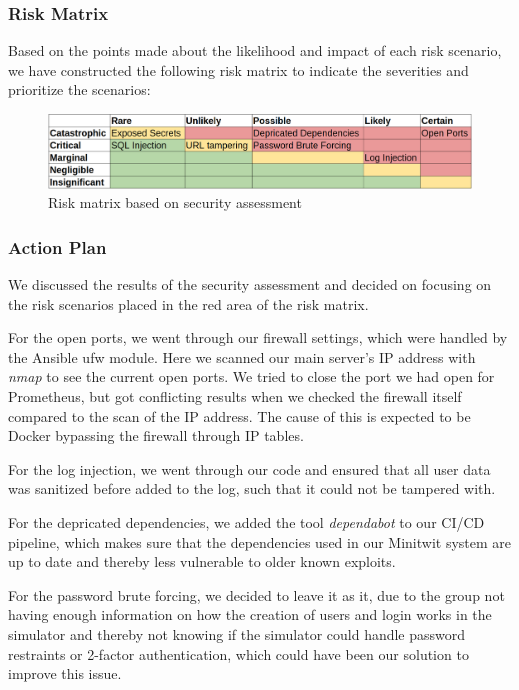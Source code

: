 \subsubsection{Risk Matrix}
Based on the points made about the likelihood and impact of each risk scenario, we have constructed the following risk matrix to indicate the severities and prioritize the scenarios:
\begin{figure}[H]
    \centering
    \includegraphics[width=1\linewidth]{images/risk-matrix.png}
    \caption{Risk matrix based on security assessment}
    \label{fig:enter-label}
\end{figure}
\subsubsection{Action Plan}
We discussed the results of the security assessment and decided on focusing on the risk scenarios placed in the red area of the risk matrix.

For the open ports, we went through our firewall settings, which were handled by the Ansible ufw module. Here we scanned our main server's IP address with \textit{nmap} to see the current open ports. We tried to close the port we had open for Prometheus, but got conflicting results when we checked the firewall itself compared to the scan of the IP address. The cause of this is expected to be Docker bypassing the firewall through IP tables.

For the log injection, we went through our code and ensured that all user data was sanitized before added to the log, such that it could not be tampered with.

For the depricated dependencies, we added the tool \textit{dependabot} to our CI/CD pipeline, which makes sure that the dependencies used in our Minitwit system are up to date and thereby less vulnerable to older known exploits.

For the password brute forcing, we decided to leave it as it, due to the group not having enough information on how the creation of users and login works in the simulator and thereby not knowing if the simulator could handle password restraints or 2-factor authentication, which could have been our solution to improve this issue.
